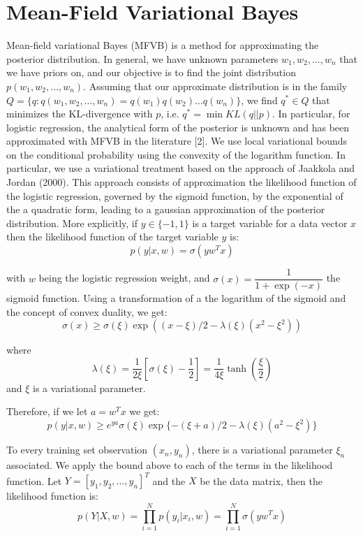 
\section{Mean-Field Variational Bayes}\label{sec:mfvb}

Mean-field variational Bayes (MFVB) is a method for approximating the posterior distribution.  In general, we have unknown parameters $w_1, w_2, \ldots, w_n$ that we have priors on, and our objective is to find the joint distribution $p(w_1, w_2, \ldots, w_n)$.  Assuming that our approximate distribution is in the family $Q = \{q : q(w_1, w_2, \ldots, w_n) = q(w_1)q(w_2) \ldots q(w_n)\}$, we find $q^* \in Q$ that minimizes the KL-divergence with $p$, i.e. $q^* = \min KL(q || p)$. 
In particular, for logistic regression, the analytical form of the posterior is unknown and has been approximated with MFVB in the literature [2]. We use local variational bounds on the conditional probability using the convexity of the logarithm function. In particular, we use a variational treatment based on the approach of Jaakkola and Jordan (2000). 
This approach consists of approximation the likelihood function of the logistic regression, governed by the sigmoid function, by the exponential of the a quadratic form, leading to a gaussian approximation of the posterior distribution. More explicitly, if $y\in \{-1,1\}$ is a target variable for a data vector $x$ then the likelihood function of the target variable $y$ is: 
\begin{equation}
p(y | x, w)=\sigma(y w^T x)
\end{equation}

with $w$ being the logistic regression weight, and $\sigma(x)=\dfrac{1}{1+\exp(-x)}$ the sigmoid function. 
Using a transformation of a the logarithm of the sigmoid and the concept of convex duality, we get: 
\begin{equation}
\sigma(x) \geq \sigma(\xi)\exp((x-\xi)/2-\lambda(\xi)(x^2-\xi^2))
\end{equation}

where
$$\lambda(\xi)=\frac{1}{2\xi}[\sigma(\xi)-\frac{1}{2}]=\frac{1}{4\xi}\tanh(\frac{\xi}{2})$$
and $\xi$ is a variational parameter. 

Therefore, if we let $a=w^T x$ we get: 
\begin{equation}
p( y | x,w)\geq e^{ya} \sigma(\xi)\exp\{-(\xi+a)/2-\lambda(\xi)(a^2-\xi^2)\}
\end{equation}

To every training set observation $(x_n, y_n)$, there is a variational parameter $\xi_n$ associated. We apply the bound above to each of the terms in the likelihood function. Let $Y=[y_1, y_2, \ldots , y_n]^T$ and the $X$ be the data matrix, then the likelihood function is: 
\begin{equation}
p( Y | X, w)=\prod_{i=1}^{N} p(y_i | x_i, w) = \prod_{i=1}^{N} \sigma(y w^T x)
\end{equation}

